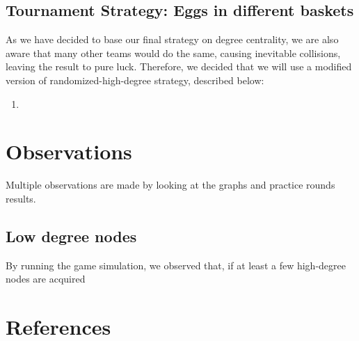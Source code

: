 \documentclass[12pt]{article}
\begin{document}
\subsection{Tournament Strategy: Eggs in different baskets}
As we have decided to base our final strategy on degree centrality, we are also aware that many other teams would do the same, causing inevitable collisions, leaving the result to pure luck. Therefore, we decided that we will use a modified version of randomized-high-degree strategy, described below:
\begin{enumerate}
\item 
\end{enumerate}

\section{Observations}
Multiple observations are made by looking at the graphs and practice rounds results.
\subsection{Low degree nodes}
By running the game simulation, we observed that, if at least a few high-degree nodes are acquired

\section{References}
\end{document}
